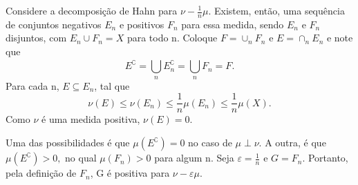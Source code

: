\documentclass[MeasureTheory/measure_theory.tex]{subfiles}
\begin{document}
\begin{proof*}
	Considere a decomposição de Hahn para \(\nu -\frac{1}{n}\mu .\) Existem, então, uma sequência de conjuntos negativos \(E_{n}\) e positivos \(F_{n}\) para essa medida, sendo \(E_{n}\) e \(F_{n}\) disjuntos, com \(E_{n}\cup F_{n} = X\) para todo n.
	Coloque \(F = \cup _n F_{n}\) e \(E = \cap_{n} E_{n}\) e note que
	\[
		E ^{\complement} = \bigcup_{n}^{}E_{n}^{\complement} = \bigcup_{n}^{}F_{n} = F.
	\]
	Para cada n, \(E\subseteq E_{n}\), tal que
	\[
		\nu (E) \leq \nu (E_{n}) \leq \frac{1}{n}\mu (E_{n})\leq \frac{1}{n}\mu (X).
	\]
	Como \(\nu \) é uma medida positiva, \(\nu (E) = 0.\)

	Uma das possibilidades é que \(\mu (E ^{\complement}) = 0\) no caso de \(\mu \perp \nu \). A outra, é que \(\mu (E ^{\complement})>0,\) no qual \(\mu (F_{n}) > 0\) para algum n. Seja \(\varepsilon  = \frac{1}{n}\) e \(G = F_{n}.\) Portanto,
	pela definição de \(F_{n}\), G é positiva para \(\nu - \varepsilon \mu .\) \qedsymbol
\end{proof*}
\end{document}
